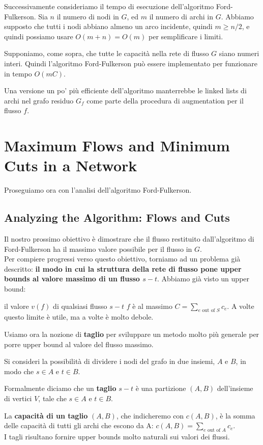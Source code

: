 Successivamente consideriamo il tempo di esecuzione dell'algoritmo
Ford-Fulkerson. Sia $n$ il numero di nodi in $G$, ed $m$ il numero
di archi in $G$. Abbiamo supposto che tutti i nodi abbiano almeno un
arco incidente, quindi $m \ge n/2$, e quindi possiamo usare
$O(m + n ) = O(m)$ per semplificare i limiti.

\begin{myblockquote}
Supponiamo, come sopra, che tutte le capacità nella rete di flusso $G$
siano numeri interi. Quindi l'algoritmo Ford-Fulkerson può essere
implementato per funzionare in tempo $O(mC)$.
\end{myblockquote}

Una versione un po' più efficiente dell'algoritmo manterrebbe le linked
lists di archi nel grafo residuo $G_f$ come parte della procedura di
augmentation per il flusso $f$.


\section{Maximum Flows and Minimum Cuts in a Network}

Proseguiamo ora con l'analisi dell'algoritmo Ford-Fulkerson.


\subsection{Analyzing the Algorithm: Flows and Cuts}

Il nostro prossimo obiettivo è dimostrare che il flusso restituito
dall'algoritmo di Ford-Fulkerson ha il massimo valore possibile per il
flusso in $G$.\\

Per compiere progressi verso questo obiettivo, torniamo ad un problema
già descritto: \textbf{il modo in cui la struttura della rete di flusso
pone upper bounds al valore massimo di un flusso $s-t$}. Abbiamo già
visto un upper bound:

\begin{myblockquote}
    il valore $v(f)$ di qualsiasi
    flusso $s-t$ $f$ è al massimo
    $C = \sum_{e \text{ out of } S} c_e$. A volte questo limite è utile,
    ma a volte è molto debole.
\end{myblockquote}

Usiamo ora la nozione di \textbf{taglio} per sviluppare un metodo molto
più generale per porre upper bound al valore del flusso massimo.

\begin{myblockquote}
    Si consideri la possibilità di dividere i nodi del grafo
    in due insiemi, $A$ e $B$, in modo che $s \in A$ e $t \in B$.
    
    Formalmente diciamo che un \textbf{taglio} $s-t$ è una
    partizione $(A, B)$ dell'insieme di vertici $V$, tale che
    $s \in A$ e $t \in B$.
    
    La \textbf{capacità di un taglio} $(A, B)$, che indicheremo con $c(A , B)$, è la somma delle
    capacità di tutti gli archi che escono da A:
    $
     c(A, B) = \sum_{e \text{ out of } A} c_e.
    $\\
   I tagli risultano fornire upper bounds molto naturali sui valori dei flussi.
\end{myblockquote}

